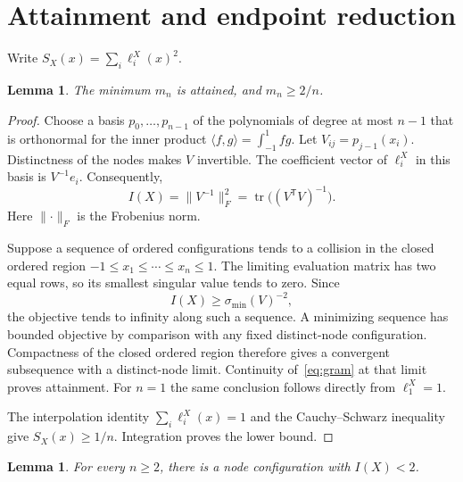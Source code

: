 \documentclass[11pt,leqno]{amsart}
\newtheorem{lemma}[theorem]{Lemma}
\theoremstyle{definition}
\theoremstyle{remark}
\numberwithin{equation}{section}
\newcommand{\tr}{\operatorname{tr}}
\newcommand{\norm}[1]{\lVert #1\rVert}
\begin{document}
\section{Attainment and endpoint reduction}\label{sec:endpoints}

Write $S_X(x)=\sum_i\ell_i^X(x)^2$.

\begin{lemma}\label{lem:attainment}
The minimum $m_n$ is attained, and $m_n\geq2/n$.
\end{lemma}

\begin{proof}
Choose a basis $p_0,\ldots,p_{n-1}$ of the polynomials of degree at most
$n-1$ that is orthonormal for the inner product
$\langle f,g\rangle=\int_{-1}^1fg$. Let
$V_{ij}=p_{j-1}(x_i)$. Distinctness of the nodes makes $V$ invertible.
The coefficient vector of $\ell_i^X$ in this basis is $V^{-1}e_i$.
Consequently,
\begin{equation}\label{eq:gram}
 I(X)=\norm{V^{-1}}_F^2
      =\tr\bigl((V^{\mathsf T}V)^{-1}\bigr).
\end{equation}
Here $\norm{\cdot}_F$ is the Frobenius norm.

Suppose a sequence of ordered configurations tends to a collision in
the closed ordered region
$-1\leq x_1\leq\cdots\leq x_n\leq1$. The limiting evaluation matrix has
two equal rows, so its smallest singular value tends to zero. Since
\[
 I(X)\geq\sigma_{\min}(V)^{-2},
\]
the objective tends to infinity along such a sequence.
A minimizing sequence has bounded objective by comparison with any
fixed distinct-node configuration. Compactness of the closed ordered
region therefore gives a convergent subsequence with a distinct-node
limit. Continuity of~\eqref{eq:gram} at that limit proves attainment.
For $n=1$ the same conclusion follows directly from $\ell_1^X=1$.

The interpolation identity $\sum_i\ell_i^X(x)=1$ and the Cauchy--Schwarz
inequality give $S_X(x)\geq1/n$. Integration proves the lower bound.
\end{proof}

\begin{lemma}\label{lem:strict-upper}
For every $n\geq2$, there is a node configuration with $I(X)<2$.
\end{lemma}
\end{document}

